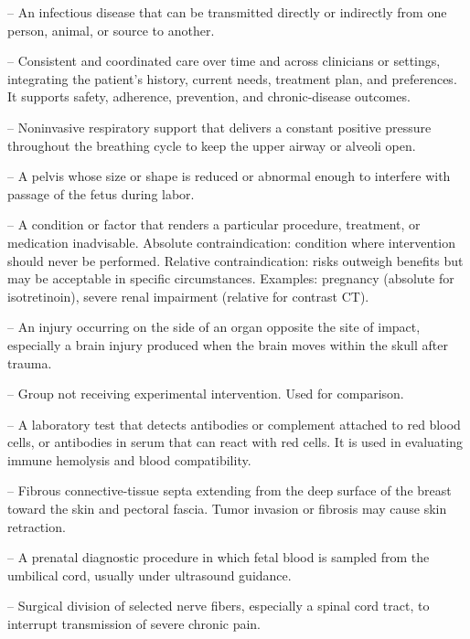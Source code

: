 -- An infectious disease that can be transmitted directly or indirectly from one person, animal, or source to another.

-- Consistent and coordinated care over time and across clinicians or settings, integrating the patient’s history, current needs, treatment plan, and preferences. It supports safety, adherence, prevention, and chronic-disease outcomes.

-- Noninvasive respiratory support that delivers a constant positive pressure throughout the breathing cycle to keep the upper airway or alveoli open.

-- A pelvis whose size or shape is reduced or abnormal enough to interfere with passage of the fetus during labor.

-- A condition or factor that renders a particular procedure, treatment, or medication inadvisable. Absolute contraindication: condition where intervention should never be performed. Relative contraindication: risks outweigh benefits but may be acceptable in specific circumstances. Examples: pregnancy (absolute for isotretinoin), severe renal impairment (relative for contrast CT).

-- An injury occurring on the side of an organ opposite the site of impact, especially a brain injury produced when the brain moves within the skull after trauma.

-- Group not receiving experimental intervention. Used for comparison.

-- A laboratory test that detects antibodies or complement attached to red blood cells, or antibodies in serum that can react with red cells. It is used in evaluating immune hemolysis and blood compatibility.

-- Fibrous connective-tissue septa extending from the deep surface of the breast toward the skin and pectoral fascia. Tumor invasion or fibrosis may cause skin retraction.

-- A prenatal diagnostic procedure in which fetal blood is sampled from the umbilical cord, usually under ultrasound guidance.

-- Surgical division of selected nerve fibers, especially a spinal cord tract, to interrupt transmission of severe chronic pain.

